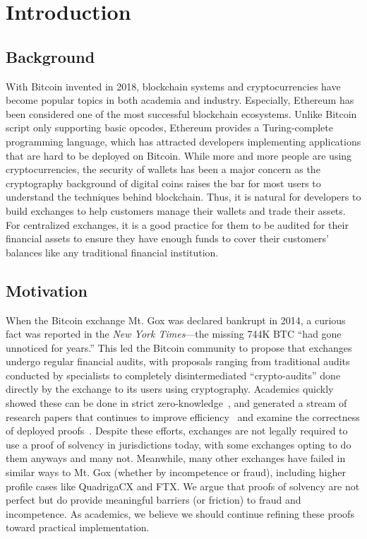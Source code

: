 \chapter{Introduction}

\section{Background}

With Bitcoin invented in 2018, blockchain systems and cryptocurrencies have become popular topics in both academia and industry. Especially, Ethereum has been considered one of the most successful blockchain ecosystems. Unlike Bitcoin script only supporting basic opcodes, Ethereum provides a Turing-complete programming language, which has attracted developers implementing applications that are hard to be deployed on Bitcoin. While more and more people are using cryptocurrencies, the security of wallets has been a major concern as the cryptography background of digital coins raises the bar for most users to understand the techniques behind blockchain. Thus, it is natural for developers to build exchanges to help customers manage their wallets and trade their assets. For centralized exchanges, it is a good practice for them to be audited for their financial assets to ensure they have enough funds to cover their customers' balances like any traditional financial institution.

\section{Motivation}

When the Bitcoin exchange Mt. Gox was declared bankrupt in 2014, a curious fact was reported in the \textit{New York Times}---the missing 744K BTC ``had gone unnoticed for years.'' This led the Bitcoin community to propose that exchanges undergo regular financial audits, with proposals ranging from traditional audits conducted by specialists to completely disintermediated ``crypto-audits'' done directly by the exchange to its users using cryptography. Academics quickly showed these can be done in strict zero-knowledge~\cite{provisions}, and generated a stream of research papers that continues to improve efficiency~\cite{bulletproofs,zeroledge,dapol,spp,notus,izpr} and examine the correctness of deployed proofs~\cite{broken}. Despite these efforts, exchanges are not legally required to use a proof of solvency in jurisdictions today, with some exchanges opting to do them anyways and many not. Meanwhile, many other exchanges have failed in similar ways to Mt. Gox (whether by incompetence or fraud), including higher profile cases like QuadrigaCX and FTX. We argue that proofs of solvency are not perfect but do provide meaningful barriers (or friction) to fraud and incompetence. As academics, we believe we should continue refining these proofs toward practical implementation.  

